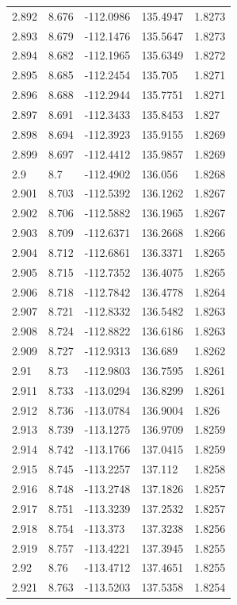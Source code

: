\begin{tabular}{lllll}
2.892 & 8.676 & -112.0986 & 135.4947 & 1.8273 \\
2.893 & 8.679 & -112.1476 & 135.5647 & 1.8273 \\
2.894 & 8.682 & -112.1965 & 135.6349 & 1.8272 \\
2.895 & 8.685 & -112.2454 & 135.705 & 1.8271 \\
2.896 & 8.688 & -112.2944 & 135.7751 & 1.8271 \\
2.897 & 8.691 & -112.3433 & 135.8453 & 1.827 \\
2.898 & 8.694 & -112.3923 & 135.9155 & 1.8269 \\
2.899 & 8.697 & -112.4412 & 135.9857 & 1.8269 \\
2.9 & 8.7 & -112.4902 & 136.056 & 1.8268 \\
2.901 & 8.703 & -112.5392 & 136.1262 & 1.8267 \\
2.902 & 8.706 & -112.5882 & 136.1965 & 1.8267 \\
2.903 & 8.709 & -112.6371 & 136.2668 & 1.8266 \\
2.904 & 8.712 & -112.6861 & 136.3371 & 1.8265 \\
2.905 & 8.715 & -112.7352 & 136.4075 & 1.8265 \\
2.906 & 8.718 & -112.7842 & 136.4778 & 1.8264 \\
2.907 & 8.721 & -112.8332 & 136.5482 & 1.8263 \\
2.908 & 8.724 & -112.8822 & 136.6186 & 1.8263 \\
2.909 & 8.727 & -112.9313 & 136.689 & 1.8262 \\
2.91 & 8.73 & -112.9803 & 136.7595 & 1.8261 \\
2.911 & 8.733 & -113.0294 & 136.8299 & 1.8261 \\
2.912 & 8.736 & -113.0784 & 136.9004 & 1.826 \\
2.913 & 8.739 & -113.1275 & 136.9709 & 1.8259 \\
2.914 & 8.742 & -113.1766 & 137.0415 & 1.8259 \\
2.915 & 8.745 & -113.2257 & 137.112 & 1.8258 \\
2.916 & 8.748 & -113.2748 & 137.1826 & 1.8257 \\
2.917 & 8.751 & -113.3239 & 137.2532 & 1.8257 \\
2.918 & 8.754 & -113.373 & 137.3238 & 1.8256 \\
2.919 & 8.757 & -113.4221 & 137.3945 & 1.8255 \\
2.92 & 8.76 & -113.4712 & 137.4651 & 1.8255 \\
2.921 & 8.763 & -113.5203 & 137.5358 & 1.8254 \\

\end{tabular}
